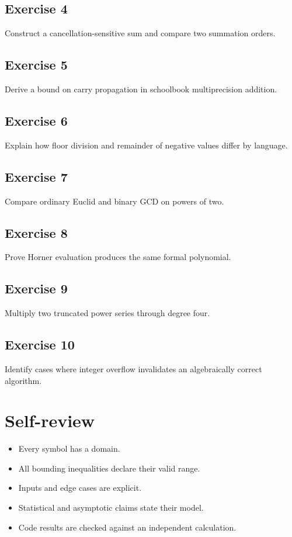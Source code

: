 \documentclass[11pt,letterpaper]{article}
\begin{document}
\subsection{Exercise 4}\noindent Construct a cancellation-sensitive sum and compare two summation orders.
\subsection{Exercise 5}\noindent Derive a bound on carry propagation in schoolbook multiprecision addition.
\subsection{Exercise 6}\noindent Explain how floor division and remainder of negative values differ by language.
\subsection{Exercise 7}\noindent Compare ordinary Euclid and binary GCD on powers of two.
\subsection{Exercise 8}\noindent Prove Horner evaluation produces the same formal polynomial.
\subsection{Exercise 9}\noindent Multiply two truncated power series through degree four.
\subsection{Exercise 10}\noindent Identify cases where integer overflow invalidates an algebraically correct algorithm.
\section{Self-review}
\begin{itemize}\item Every symbol has a domain.\item All bounding inequalities declare their valid range.\item Inputs and edge cases are explicit.\item Statistical and asymptotic claims state their model.\item Code results are checked against an independent calculation.\end{itemize}
\end{document}
